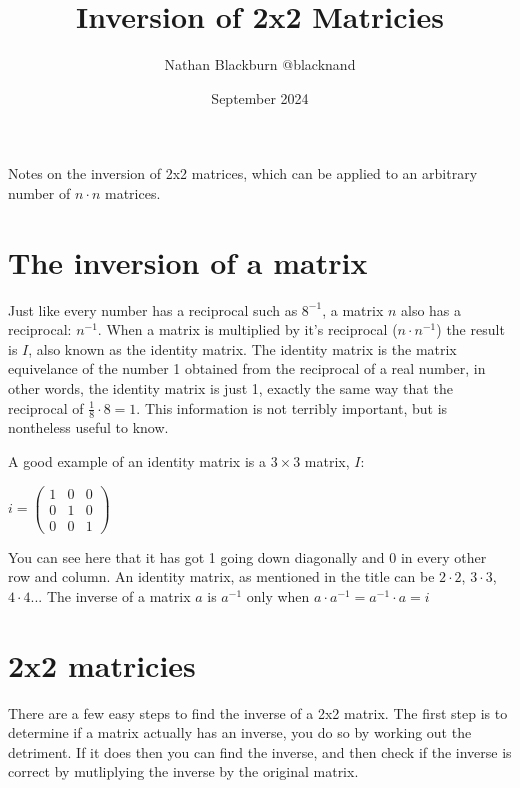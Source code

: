 \documentclass[options]{article}
\title{Inversion of 2x2 Matricies}
\author{Nathan Blackburn {@blacknand}}
\date{September 2024}
\begin{document}
\maketitle
Notes on the inversion of 2x2 matrices, which can be applied to an arbitrary number of \( n \cdot n \) matrices.
\vspace{-1em}
\section{The inversion of a matrix}
Just like every number has a reciprocal such as \(8^{-1}\), a matrix \(n\) also has a reciprocal: \(n^{-1}\). When a matrix
is multiplied by it's reciprocal (\(n \cdot n^{-1}\)) the result is \(I\), also known as the identity matrix. The identity matrix
is the matrix equivelance of the number 1 obtained from the reciprocal of a real number, in other words, the identity matrix is just 1, exactly the same
way that the reciprocal of \(\frac{1}{8} \cdot 8 = 1\). This information is not terribly important, but is nontheless useful to know.
\par


A good example of an identity matrix is a \( 3 \times 3 \) matrix, \( I \):

\begin{center}

    \(
        i = 
        \begin{pmatrix}
        1 & 0 & 0\\
        0 & 1 & 0\\
        0 & 0 & 1
        \end{pmatrix}
    \)

\end{center}

You can see here that it has got 1 going down diagonally and 0 in every other row and column. An identity
matrix, as mentioned in the title can be \(2 \cdot 2\), \(3 \cdot 3\), \(4 \cdot 4\)... The inverse of a matrix \(a\) is \(a^{-1}\) only when \(a \cdot a^{-1} = a^{-1} \cdot a = i\)

\section{2x2 matricies}
There are a few easy steps to find the inverse of a 2x2 matrix. The first step is to determine if a matrix actually has an inverse, you do so by working out the detriment. 
If it does then you can find the inverse, and then check if the inverse is correct by mutliplying the inverse by the original matrix.
\end{document}
